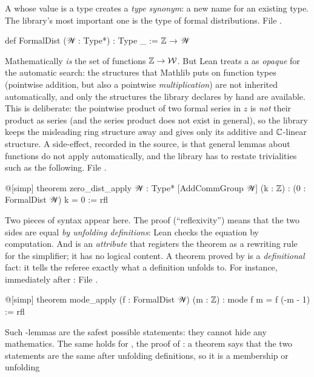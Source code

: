 A  whose value is a type creates a \emph{type synonym}: a new name for an existing type.
The library's most important one is the type of formal distributions.
\noindent File .
\begin{leancode}
def FormalDist (𝒲 : Type*) : Type _ := ℤ → 𝒲
\end{leancode}
Mathematically  \emph{is} the set of functions ${\mathbb{Z}}\to\mathcal W$. But Lean
treats a  as \emph{opaque} for the automatic search: the structures that Mathlib puts on
function types (pointwise addition, but also a pointwise \emph{multiplication}) are not inherited
automatically, and only the structures the library declares by hand are available. This is
deliberate: the pointwise product of two formal series in $z$ is \emph{not} their product as series
(and the series product does not exist in general), so the library keeps the misleading ring
structure away and gives  only its additive and ${\mathbb{C}}$-linear structure. A
side-effect, recorded in the source, is that general lemmas about functions do not apply
automatically, and the library has to restate trivialities such as the following.
\noindent File .
\begin{leancode}
@[simp] theorem zero_dist_apply {𝒲 : Type*} [AddCommGroup 𝒲] (k : ℤ) :
    (0 : FormalDist 𝒲) k = 0 := rfl
\end{leancode}
Two pieces of syntax appear here. The proof  (``reflexivity'') means that the two sides
are equal \emph{by unfolding definitions}: Lean checks the equation by computation. And
 is an \emph{attribute} that registers the theorem as a rewriting rule for the
simplifier; it has no logical content. A theorem proved by  is a \emph{definitional}
fact: it tells the referee exactly what a definition unfolds to. For instance, immediately after
:
\noindent File .
\begin{leancode}
@[simp] theorem mode_apply (f : FormalDist 𝒲) (m : ℤ) : mode f m = f (-m - 1) := rfl
\end{leancode}
Such -lemmas are the safest possible statements: they cannot hide any mathematics. The
same holds for , the proof of : a theorem  says that
the two statements are the same after unfolding definitions, so it is a membership or unfolding
